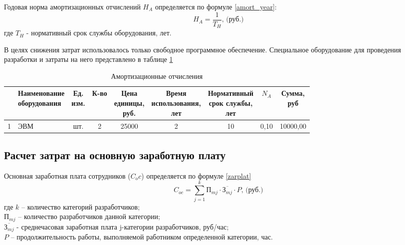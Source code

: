 Годовая норма амортизационных отчислений $H_A$ определяется по формуле \ref{amort_year}:
\begin{equation}
H_A = \frac{1}{T_H}\mbox{, (руб.)}
\label{amort_year}
\end{equation}
где   $T_H$ - нормативный срок службы оборудования, лет. 

В целях снижения затрат использовалось только свободное программное обеспечение. Специальное оборудование для проведения разработки и затраты на него представлено в таблице \ref{amort_items}
\begin{table}[h]
	\caption{Амортизационные отчисления}
	\label{amort_items}
	\begin{tabular}{|l|l|c|c|c|c|c|c|c|}
		\hline
			\No & \thead{Наименование\\оборудования} & \thead{Ед.\\ изм.} & К-во & \thead{Цена\\единицы,\\руб.} & \thead{Время\\ использования,\\ лет} & \thead{Нормативный\\ срок службы,\\ лет} & $N_A$ & \thead{Сумма,\\ руб}\\
		\hline
			1 & ЭВМ & шт. & 2 & 25000 & 2 & 10 & 0,10 & 10000,00 \\
		\hline
	\end{tabular}
\end{table}

\subsection{Расчет затрат на основную заработную плату}
Основная заработная плата сотрудников ($C_oc$) определяется по формуле \ref{zarplat} 
\begin{equation}
	C_{oc} = \sum_{j=1}^k \textit{П}_{mj} \cdot \overline{\textit{З}_{mj}} \cdot P \mbox{, (руб.)}
	\label{zarplat}
\end{equation}
где  $k$ – количество категорий разработчиков;\\
$\textit{П}_{mj}$ – количество разработчиков данной категории;\\
$\overline{\textit{З}_{mj}}$ - среднечасовая заработная плата j-категории разработчиков, руб/час;\\
$P$ – продолжительность работы, выполняемой работником определенной категории, час.

